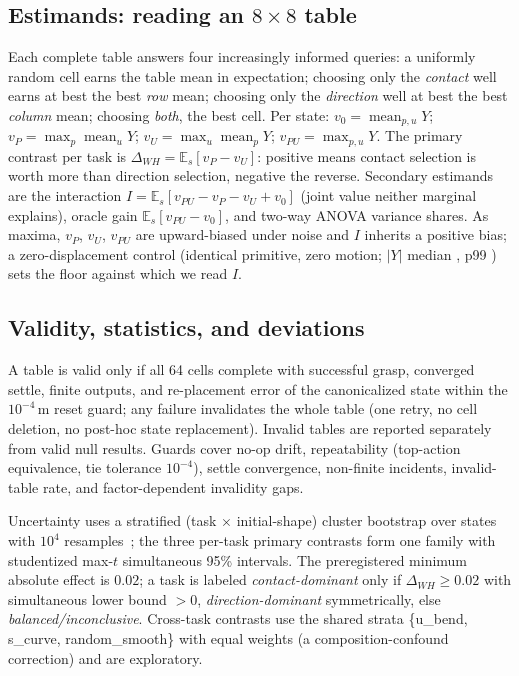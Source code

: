 \documentclass{article}
\begin{document}
\subsection{Estimands: reading an $8{\times}8$ table}
\label{sec:estimands}
Each complete table answers four increasingly informed queries: a uniformly
random cell earns the table mean in expectation; choosing only the
\emph{contact} well earns at best the best \emph{row} mean; choosing only
the \emph{direction} well at best the best \emph{column} mean; choosing
\emph{both}, the best cell. Per state: $v_0=\operatorname{mean}_{p,u} Y$;
$v_P=\max_p \operatorname{mean}_u Y$; $v_U=\max_u \operatorname{mean}_p Y$;
$v_{PU}=\max_{p,u} Y$.
The primary contrast per task is
$\Delta_{WH}=\mathbb{E}_s[v_P-v_U]$: positive means contact selection is
worth more than direction selection, negative the reverse. Secondary
estimands are the interaction $I=\mathbb{E}_s[v_{PU}-v_P-v_U+v_0]$ (joint
value neither marginal explains), oracle gain $\mathbb{E}_s[v_{PU}-v_0]$,
and two-way ANOVA variance shares. As maxima, $v_P$, $v_U$, $v_{PU}$ are
upward-biased under noise and $I$ inherits a positive bias; a
zero-displacement control (identical primitive, zero motion; $|Y|$ median
\zerodeltamed{}, p99 \zerodeltapninenine{}) sets the floor against which
we read $I$.

\subsection{Validity, statistics, and deviations}
\label{sec:validity}
A table is valid only if all 64 cells complete with successful grasp,
converged settle, finite outputs, and re-placement error of the
canonicalized state within the $10^{-4}$\,m reset guard; any failure
invalidates the whole table (one retry, no cell deletion, no post-hoc state
replacement). Invalid tables are reported separately from valid null
results. Guards cover no-op drift, repeatability (top-action equivalence,
tie tolerance $10^{-4}$), settle convergence, non-finite incidents,
invalid-table rate, and factor-dependent invalidity gaps.

Uncertainty uses a stratified (task $\times$ initial-shape) cluster
bootstrap over states with $10^4$ resamples~\citep{efron1993introduction};
the three per-task primary contrasts form one family with studentized
max-$t$ simultaneous 95\% intervals. The preregistered minimum absolute
effect is $0.02$; a task is labeled \emph{contact-dominant} only if
$\Delta_{WH}\ge 0.02$ with simultaneous lower bound $>0$,
\emph{direction-dominant} symmetrically, else
\emph{balanced/inconclusive}. Cross-task contrasts use the shared strata
\{u\_bend, s\_curve, random\_smooth\} with equal weights (a
composition-confound correction) and are exploratory.
\end{document}
